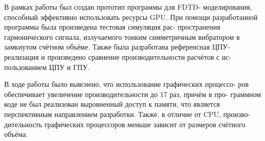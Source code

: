 
В рамках работы был создан прототип программы для FDTD-
моделирования, способный эффективно использовать ресурсы GPU. При
помощи разработанной программы была произведена тестовая симуляция рас-
пространения гармонического сигнала, излучаемого тонким симметричным
вибратором в замкнутом счётном объёме. Также была разработана референсная
ЦПУ-реализация и произведено сравнение производительности расчётов с ис-
пользованием ЦПУ и ГПУ.

В ходе работы было выяснено, что использование графических процессо-
ров обеспечивает увеличение производительности до 17 раз, причём в про-
граммном коде не был реализован выровненный доступ к памяти, что является
перспективным направлением разработки. Также, в отличие от CPU, произво-
дительность графических процессоров меньше зависит от размеров счётного
объёма.

